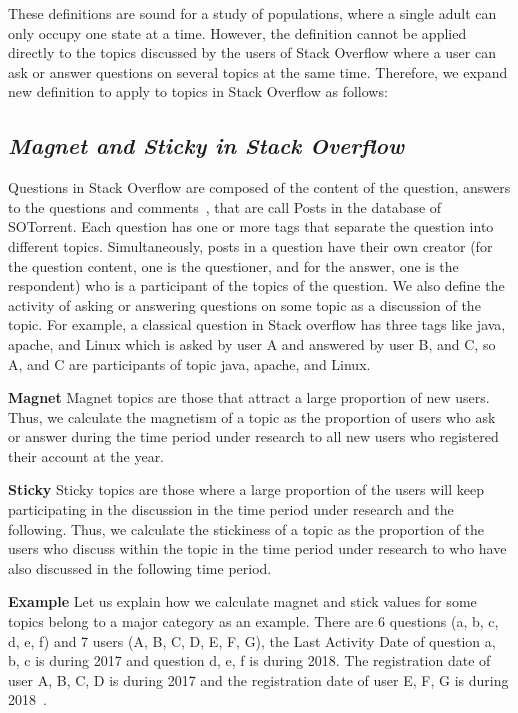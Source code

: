 \documentclass[conference]{IEEEtran}
\begin{document}
These definitions are sound for a study of populations, where a single adult can only occupy one state at a time. However, the definition cannot be applied directly to the topics discussed by the users of Stack Overflow where a user can ask or answer questions on several topics at the same time. Therefore, we expand new definition to apply to topics in Stack Overflow as follows:

\smallskip
\subsection*{\textit{\textbf{Magnet and Sticky in Stack Overflow}}}

Questions in Stack Overflow are composed of the content of the question, answers to the questions and comments~\cite{liu2018mining}, that are call Posts in the database of SOTorrent. Each question has one or more tags that separate the question into different topics. Simultaneously, posts in a question have their own creator (for the question content, one is the questioner, and for the answer, one is the respondent) who is a participant of the topics of the question. We also define the activity of asking or answering questions on some topic as a discussion of the topic. For example, a classical question in Stack overflow has three tags like java, apache, and Linux which is asked by user A and answered by user B, and C, so A, and C are participants of topic java, apache, and Linux.

\smallskip
\noindent
\textbf{Magnet}
Magnet topics are those that attract a large proportion of new users. Thus, we calculate the magnetism of a topic as the proportion of users who ask or answer during the time period under research to all new users who registered their account at the year.

\smallskip
\noindent
\textbf{Sticky}
Sticky topics are those where a large proportion of the users will keep participating in the discussion in the time period under research and the following. Thus, we calculate the stickiness of a topic as the proportion of the users who discuss within the topic in the time period under research to who have also discussed in the following time period.

\smallskip
\noindent
\textbf{Example}
Let us explain how we calculate magnet and stick values for some topics belong to a major category as an example. There are 6 questions (a, b, c, d, e, f) and 7 users (A, B, C, D, E, F, G), the Last Activity Date of question a, b, c is during 2017 and question d, e, f is during 2018. The registration date of user A, B, C, D is during 2017 and the registration date of user E, F, G is during 2018~\cite{yamashita2016magnet}.
\end{document}
